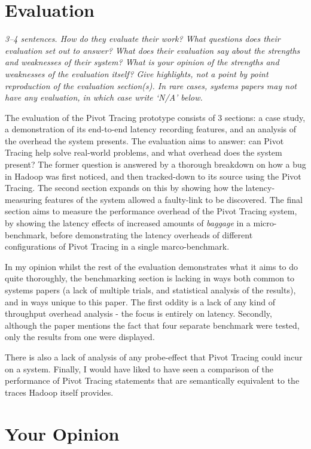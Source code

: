 \documentclass[11pt]{article}
\begin{document}
\section*{Evaluation}

\textsl{3--4 sentences. How do they evaluate their work? What questions does
their evaluation set out to answer? What does their evaluation say about the
strengths and weaknesses of their system? What is your opinion of the strengths
and weaknesses of the evaluation itself? Give highlights, not a point by point
reproduction of the evaluation section(s). In rare cases, systems papers may
not have any evaluation, in which case write `N/A' below.}

The evaluation of the Pivot Tracing prototype consists of 3 sections: a case
study, a demonstration of its end-to-end latency recording features, and an
analysis of the overhead the system presents. The evaluation aims to answer:
can Pivot Tracing help solve real-world problems, and what overhead does the
system present? The former question is answered by a thorough breakdown on how
a bug in Hadoop was first noticed, and then tracked-down to its source using
the Pivot Tracing. The second section expands on this by showing how the
latency-measuring features of the system allowed a faulty-link to be
discovered. The final section aims to measure the performance overhead of the
Pivot Tracing system, by showing the latency effects of increased amounts of
\textit{baggage} in a micro-benchmark, before demonstrating the latency
overheads of different configurations of Pivot Tracing in a single
marco-benchmark.

In my opinion whilst the rest of the evaluation demonstrates what it aims to do
quite thoroughly, the benchmarking section is lacking in ways both common to
systems papers (a lack of multiple trials, and statistical analysis of the
results), and in ways unique to this paper. The first oddity is a lack of any
kind of throughput overhead analysis - the focus is entirely on latency. Secondly,
although the paper mentions the fact that four separate benchmark were tested,
only the results from one were displayed.

There is also a lack of analysis of any probe-effect that Pivot Tracing could
incur on a system. Finally, I would have liked to have seen a comparison of the
performance of Pivot Tracing statements that are semantically equivalent to the
traces Hadoop itself provides.


\section*{Your Opinion}
\end{document}
